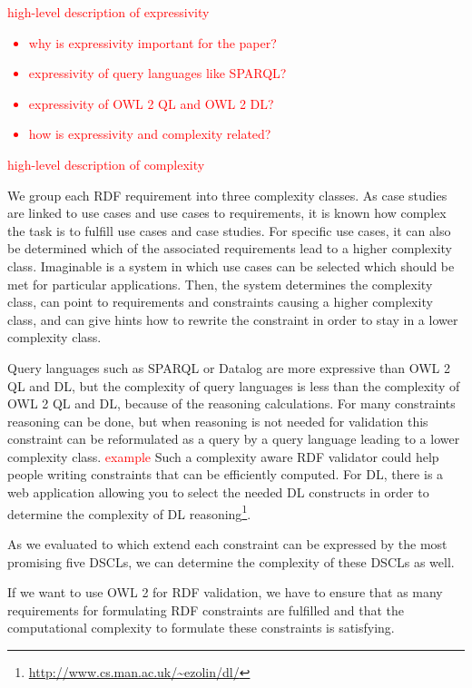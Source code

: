 \documentclass{llncs}
\begin{document}
\textcolor{red}{high-level description of expressivity}

\textcolor{red}{
\begin{itemize}
  \item why is expressivity important for the paper?
	\item expressivity of query languages like SPARQL?
	\item expressivity of OWL 2 QL and OWL 2 DL?
	\item how is expressivity and complexity related?
\end{itemize}
}

\textcolor{red}{high-level description of complexity}

We group each RDF requirement into three complexity classes.
As case studies are linked to use cases and use cases to requirements, it is known how complex the task is to fulfill use cases and case studies.
For specific use cases, it can also be determined which of the associated requirements lead to a higher complexity class.
Imaginable is a system in which use cases can be selected which should be met for particular applications.
Then, the system determines the complexity class, can point to requirements and constraints causing a higher complexity class,
and can give hints how to rewrite the constraint in order to stay in a lower complexity class.   

Query languages such as SPARQL or Datalog are more expressive than OWL 2 QL and DL,
but the complexity of query languages is less than the complexity of OWL 2 QL and DL, because of the reasoning calculations.
For many constraints reasoning can be done, but when reasoning is not needed for validation this constraint can be reformulated as a query by a query language
leading to a lower complexity class. 
\textcolor{red}{example}
Such a complexity aware RDF validator could help people writing constraints that can be efficiently computed.
For DL, there is a web application allowing you to select the needed DL constructs in order to determine the complexity of DL reasoning\footnote{\url{http://www.cs.man.ac.uk/~ezolin/dl/}}.

As we evaluated to which extend each constraint can be expressed by the most promising five DSCLs, 
we can determine the complexity of these DSCLs as well. 

If we want to use OWL 2 for RDF validation, we have to ensure that as many requirements for formulating RDF constraints are fulfilled
and that the computational complexity to formulate these constraints is satisfying.  
\end{document}
